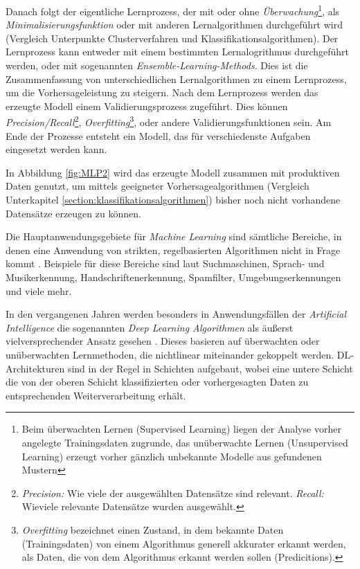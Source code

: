 Danach folgt der eigentliche Lernprozess, der mit oder ohne \textit{Überwachung}\footnote{Beim überwachten Lernen (Supervised Learning) liegen der Analyse vorher angelegte Trainingsdaten zugrunde, das unüberwachte Lernen (Unsupervised Learning) erzeugt vorher gänzlich unbekannte Modelle aus gefundenen Mustern }, als \textit{Minimalisierungsfunktion} oder mit anderen Lernalgorithmen durchgeführt wird (Vergleich Unterpunkte Clusterverfahren und Klassifikationsalgorithmen). Der Lernprozess kann entweder mit einem bestimmten Lernalogrithmus durchgeführt werden, oder mit sogenannten \textit{Ensemble-Learning-Methods}. Dies ist die Zusammenfassung von unterschiedlichen Lernalgorithmen zu einem Lernprozess, um die Vorhersageleistung zu steigern. Nach dem Lernprozess werden das erzeugte Modell einem Validierungsprozess zugeführt. Dies können \textit{Precision/Recall}\footnote{\textit{Precision:} Wie viele der ausgewählten Datensätze sind relevant. \textit{Recall:} Wieviele relevante Datensätze wurden ausgewählt. }, \textit{Overfitting}\footnote{\textit{Overfitting} bezeichnet einen Zustand, in dem bekannte Daten (Trainingsdaten) von einem Algorithmus generell akkurater erkannt werden, als Daten, die von dem Algorithmus erkannt werden sollen (Predicitions).}, oder andere Validierungsfunktionen sein. Am Ende der Prozesse entsteht ein Modell, das für verschiedenste Aufgaben eingesetzt werden kann. 

In Abbildung \ref{fig:MLP2} wird das erzeugte Modell zusammen mit produktiven Daten genutzt, um mittels geeigneter Vorhersagealgorithmen (Vergleich Unterkapitel \ref{section:klassifikationsalgorithmen}) bisher noch nicht vorhandene Datensätze erzeugen zu können.  

Die Hauptanwendungsgebiete für \textit{Machine Learning} sind sämtliche Bereiche, in denen eine Anwendung von strikten, regelbasierten Algorithmen nicht in Frage kommt . Beispiele für diese Bereiche sind laut  Suchmaschinen, Sprach- und Musikerkennung, Handschriftenerkennung, Spamfilter, Umgebungserkennungen und viele mehr. 

In den vergangenen Jahren werden besonders in Anwendungsfällen der \textit{Artificial Intelligence} die sogenannten \textit{Deep Learning Algorithmen} als äußerst vielversprechender Ansatz gesehen . Dieses basieren auf überwachten oder unüberwachten Lernmethoden, die nichtlinear miteinander gekoppelt werden. DL-Architekturen sind in der Regel in Schichten aufgebaut, wobei eine untere Schicht die von der oberen Schicht klassifizierten oder vorhergesagten Daten zu entsprechenden Weiterverarbeitung erhält. 

